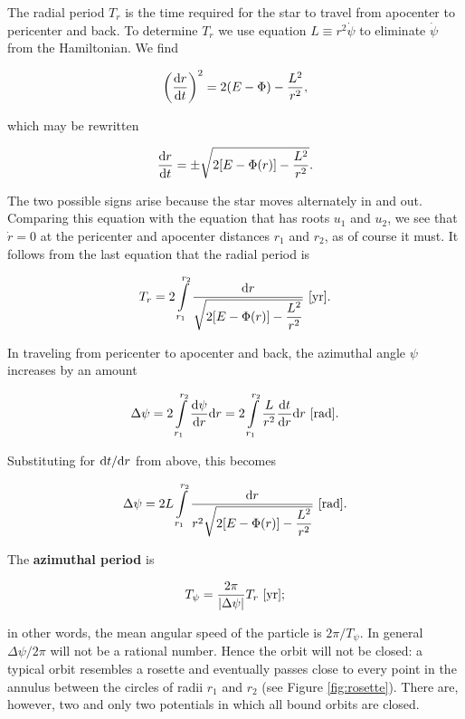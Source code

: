\documentclass[a4paper,10pt]{article}
\begin{document}
{\noindent}The radial period $T_r$ is the time required for the star to travel from apocenter to pericenter and back. To determine $T_r$ we use equation $L\equiv r^2\dot{\psi}$ to eliminate $\dot{\psi}$ from the Hamiltonian. We find

\begin{align*}
    \left(\frac{{\rm d}r}{{\rm d}t}\right)^2 = 2(E-\Phi) - \frac{L^2}{r^2},
\end{align*}

{\noindent}which may be rewritten

\begin{align*}
    \frac{{\rm d}r}{{\rm d}t} = \pm\sqrt{2[E-\Phi(r)]-\frac{L^2}{r^2}}.
\end{align*}

{\noindent}The two possible signs arise because the star moves alternately in and out. Comparing this equation with the equation that has roots $u_1$ and $u_2$, we see that $\dot{r}=0$ at the pericenter and apocenter distances $r_1$ and $r_2$, as of course it must. It follows from the last equation that the radial period is

\begin{align*}
    T_r = 2\int\limits_{r_1}^{r_2} \frac{{\rm d}r}{\sqrt{2[E-\Phi(r)]-\dfrac{L^2}{r^2}}} ~ [{\rm yr}].
\end{align*}

{\noindent}In traveling from pericenter to apocenter and back, the azimuthal angle $\psi$ increases by an amount

\begin{align*}
    \Delta\psi = 2\int\limits_{r_1}^{r_2}\frac{{\rm d}\psi}{{\rm d}r}{\rm d}r = 2\int\limits_{r_1}^{r_2} \frac{L}{r^2}\frac{{\rm d}t}{{\rm d}r}{\rm d}r ~ [{\rm rad}].
\end{align*}

{\noindent}Substituting for ${\rm d}t/{\rm d}r$ from above, this becomes

\begin{align*}
    \Delta\psi = 2L\int\limits_{r_1}^{r_2} \frac{{\rm d}r}{r^2\sqrt{2[E-\Phi(r)]-\dfrac{L^2}{r^2}}} ~ [{\rm rad}].
\end{align*}

{\noindent}The \textbf{azimuthal period} is

\begin{align*}
    T_\psi = \frac{2\pi}{\lvert\Delta\psi\rvert}T_r ~ [{\rm yr}];
\end{align*}

{\noindent}in other words, the mean angular speed of the particle is $2\pi/T_\psi$. In general $\Delta\psi/2\pi$ will not be a rational number. Hence the orbit will not be closed: a typical orbit resembles a rosette and eventually passes close to every point in the annulus between the circles of radii $r_1$ and $r_2$ (see Figure \ref{fig:rosette}). There are, however, two and only two potentials in which all bound orbits are closed.
\end{document}
